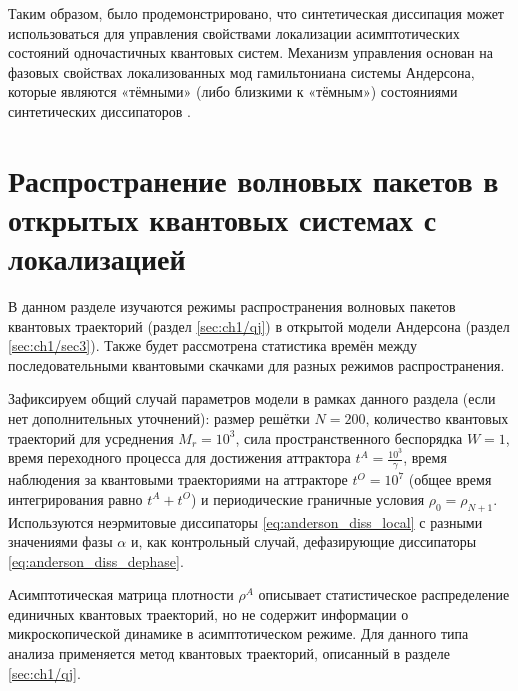 Таким образом, было продемонстрировано, что синтетическая диссипация может использоваться для управления свойствами локализации асимптотических состояний одночастичных квантовых систем. Механизм управления основан на фазовых свойствах локализованных мод гамильтониана системы Андерсона, которые являются  «тёмными» (либо близкими к «тёмным») состояниями синтетических диссипаторов \cite{Vershinina2017}.

\section{Распространение волновых пакетов в открытых квантовых системах с локализацией}\label{sec:ch2/prb_jump}
В данном разделе изучаются режимы распространения волновых пакетов квантовых траекторий \cite{Dalibard1992, Dum1992, Plenio1998} (раздел \cref{sec:ch1/qj}) в открытой модели Андерсона (раздел \cref{sec:ch1/sec3}). Также будет рассмотрена статистика времён между последовательными квантовыми скачками для разных режимов распространения.

Зафиксируем общий случай параметров модели в рамках данного раздела (если нет дополнительных уточнений): размер решётки \(N=200\), количество квантовых траекторий для усреднения \(M_r=10^3\), сила пространственного беспорядка \(W=1\), время переходного процесса для достижения аттрактора \(t^A = \frac{10^3}{\gamma}\), время наблюдения за квантовыми траекториями на аттракторе \(t^O = 10^7\) (общее время интегрирования равно \(t^A + t^O\)) и периодические граничные условия \(\rho_0 = \rho_{N+1}\). Используются неэрмитовые диссипаторы \cref{eq:anderson_diss_local} с разными значениями фазы \(\alpha\) и, как контрольный случай, дефазирующие диссипаторы \cref{eq:anderson_diss_dephase}.

Асимптотическая матрица плотности \(\rho^A\) описывает статистическое распределение единичных квантовых траекторий, но не содержит информации о микроскопической динамике в асимптотическом режиме. Для данного типа анализа применяется метод квантовых траекторий, описанный в разделе \cref{sec:ch1/qj}.


